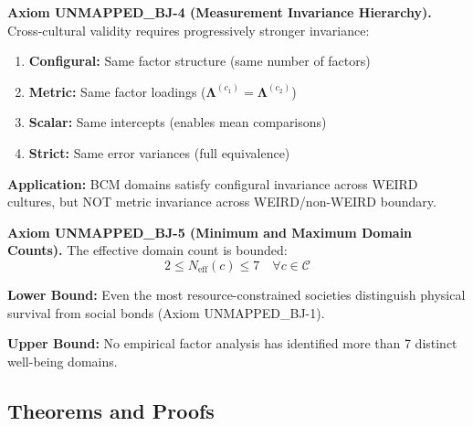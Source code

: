 \begin{tcolorbox}[colback=red!5!white, colframe=red!75!black, title=Axiom UNMAPPED_BJ-4: Factor Invariance Hierarchy]
\textbf{Axiom UNMAPPED_BJ-4 (Measurement Invariance Hierarchy).}
Cross-cultural validity requires progressively stronger invariance:
\begin{enumerate}[nosep]
\item \textbf{Configural:} Same factor structure (same number of factors)
\item \textbf{Metric:} Same factor loadings ($\boldsymbol{\Lambda}^{(c_1)} = \boldsymbol{\Lambda}^{(c_2)}$)
\item \textbf{Scalar:} Same intercepts (enables mean comparisons)
\item \textbf{Strict:} Same error variances (full equivalence)
\end{enumerate}

\textbf{Application:} BCM domains satisfy configural invariance across WEIRD cultures,
but NOT metric invariance across WEIRD/non-WEIRD boundary.
\end{tcolorbox}

\begin{tcolorbox}[colback=red!5!white, colframe=red!75!black, title=Axiom UNMAPPED_BJ-5: Domain Boundary Conditions]
\textbf{Axiom UNMAPPED_BJ-5 (Minimum and Maximum Domain Counts).}
The effective domain count is bounded:
\begin{equation}
2 \leq N_{\text{eff}}(c) \leq 7 \quad \forall c \in \mathcal{C}
\end{equation}

\textbf{Lower Bound:} Even the most resource-constrained societies distinguish physical survival
from social bonds (Axiom UNMAPPED_BJ-1).

\textbf{Upper Bound:} No empirical factor analysis has identified more than 7 distinct well-being domains.
\end{tcolorbox}

\subsection{Theorems and Proofs}

